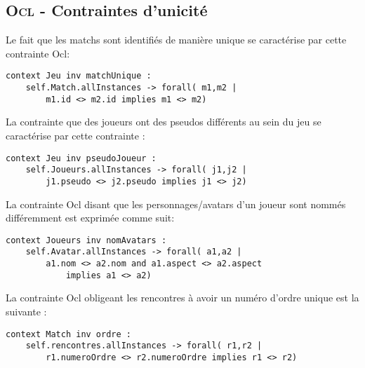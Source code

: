 
\subsection{\textsc{Ocl} - Contraintes d'unicité}
\label{sec:question3}

Le fait que les matchs sont identifiés de manière unique se caractérise par cette contrainte Ocl:

\begin{lstlisting}[caption=Contrainte sur l'unicité d'un match,captionpos=b,label={lst:match},language=OCL]
context Jeu inv matchUnique :
    self.Match.allInstances -> forall( m1,m2 |
        m1.id <> m2.id implies m1 <> m2)
\end{lstlisting}

La contrainte que des joueurs ont des pseudos différents au sein du jeu se caractérise par cette contrainte :

\begin{lstlisting}[caption=Contrainte sur les pseudos,captionpos=b,label={lst:pseudos},language=OCL]
context Jeu inv pseudoJoueur :
    self.Joueurs.allInstances -> forall( j1,j2 |
        j1.pseudo <> j2.pseudo implies j1 <> j2)
\end{lstlisting}

La contrainte Ocl disant que les personnages/avatars d'un joueur sont nommés différemment est exprimée comme suit:

\begin{lstlisting}[caption=Contrainte sur le nom,captionpos=b,label={lst:nomAvatar},language=OCL]
context Joueurs inv nomAvatars :
    self.Avatar.allInstances -> forall( a1,a2 |
        a1.nom <> a2.nom and a1.aspect <> a2.aspect
            implies a1 <> a2)
\end{lstlisting}

La contrainte Ocl obligeant les rencontres à avoir un numéro d'ordre unique est la suivante :

\begin{lstlisting}[caption=Contrainte sur le numéro d'ordre unique,captionpos=b,label={lst:numUnique},language=OCL]
context Match inv ordre :
    self.rencontres.allInstances -> forall( r1,r2 |
        r1.numeroOrdre <> r2.numeroOrdre implies r1 <> r2)
\end{lstlisting}